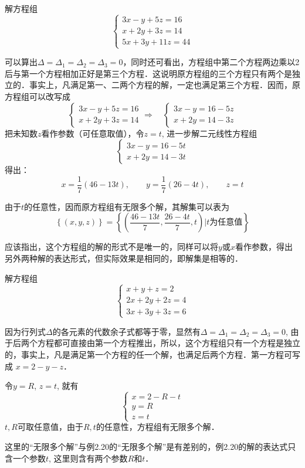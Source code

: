\begin{example}
    解方程组
    \[\begin{cases}
        3x-y+5z=16\\
        x+2y+3z=14\\
        5x+3y+11z=44
    \end{cases}\]
\end{example}

\begin{solution}
    可以算出$\Delta=\Delta_1=\Delta_2=\Delta_3=0$，同时还可看出，方程组中第二个方程两边乘以2后与第一个方程相加正好是第三个方程．这说明原方程组的三个方程只有两个是独立的．事实上，凡满足第一、二两个方程的解，一定也满足第三个方程．因而，原方程组可以改写成
    \[\begin{cases}
        3x-y+5z=16\\x+2y+3z=14
    \end{cases}\Rightarrow\quad \begin{cases}
        3x-y=16-5z\\x+2y=14-3z
    \end{cases}\]
    把未知数$z$看作参数（可任意取值），令$z=t$, 进一步解二元线性方程组
    \[\begin{cases}
        3x-y=16-5t\\x+2y=14-3t
    \end{cases}\]
    得出：
\[x=\frac{1}{7}(46-13t),\qquad y=\frac{1}{7}(26-4t),\qquad z=t\]

    由于$t$的任意性，因而原方程组有无限多个解，其解集可以表为
\[\left\{(x,y,z)\right\}=\left\{\left(\frac{46-13t}{7},\frac{26-4t}{7},t\right)\Big|\text{$t$为任意值}\right\}\]
\end{solution}

应该指出，这个方程组的解的形式不是唯一的，同样可以将$y$或$x$看作参数，得出另外两种解的表达形式，但实际效果是相同的，即解集是相等的．



\begin{example}
    解方程组
\[\begin{cases}
    x+y+z=2\\
    2x+2y+2z=4\\
    3x+3y+3z=6
\end{cases}\]
\end{example}

\begin{solution}
因为行列式$\Delta$的各元素的代数余子式都等于零，显然有$\Delta=\Delta_1=\Delta_2=\Delta_3=0$, 由于后两个方程都可直接由第一个方程推出，所以，这个方程组只有一个方程是独立的，事实上，凡是满足第一个方程的任一个解，也满足后两个方程．第一方程可写成
$x=2-y-z$．

令$y=R$, $z=t$, 就有
\[\begin{cases}
    x=2-R-t\\ y=R\\ z=t 
\end{cases}\]
$t,R$可取任意值，由于$R,t$的任意性，方程组有无限多个解．

这里的“无限多个解”与例2.20的“无限多个解”是有差别的，例2.20的解的表达式只含一个参数$t$, 这里则含有两个参数$R$和$t$．   
\end{solution}

